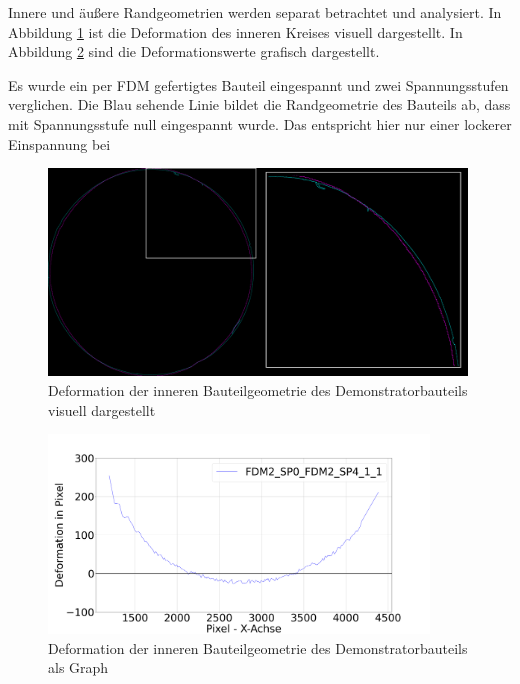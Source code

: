 Innere und äußere Randgeometrien werden separat betrachtet und analysiert.
In Abbildung \ref{fig:deformation_data_vis} ist die Deformation des inneren Kreises
visuell dargestellt. In Abbildung \ref{fig:deformation_data_graph} sind die 
Deformationswerte grafisch dargestellt.

Es wurde ein per FDM gefertigtes Bauteil eingespannt und zwei Spannungsstufen verglichen.
Die Blau sehende Linie bildet die Randgeometrie des Bauteils ab, dass mit Spannungsstufe
null eingespannt wurde. Das entspricht hier nur einer lockerer Einspannung bei 

\begin{figure}[H]
    \centering
    \includegraphics[width=0.99\textwidth]{images/FDM2_SP0_stitched_FDM2_SP4_stitched_1_1_cut.png}
    \caption{Deformation der inneren Bauteilgeometrie des Demonstratorbauteils 
    visuell dargestellt}
    \label{fig:deformation_data_vis}
\end{figure}


\begin{figure}[H]
    \centering
    \includegraphics[width=0.9\textwidth]{images/FDM_sp0_sp4_inner.png}
    \caption{Deformation der inneren Bauteilgeometrie 
    des Demonstratorbauteils als Graph}
    \label{fig:deformation_data_graph}
\end{figure}

